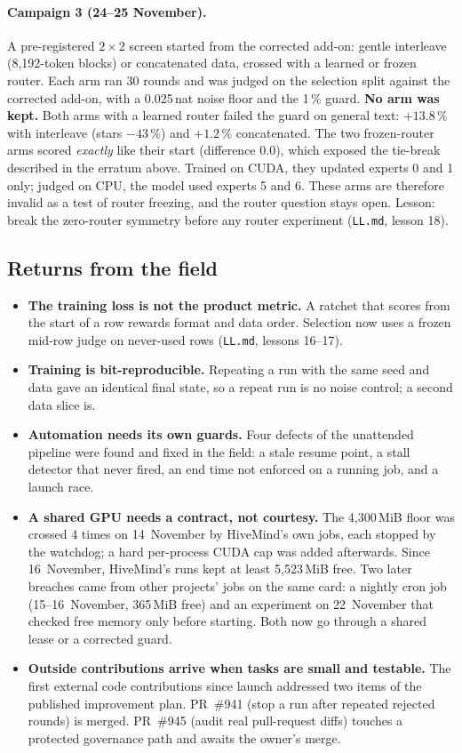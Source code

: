 \documentclass[11pt,a4paper]{article}
\begin{document}
\paragraph{Campaign 3 (24--25 November).} A pre-registered $2\times2$ screen started from the corrected add-on:
gentle interleave (8{,}192-token blocks) or concatenated data, crossed with a learned or frozen router. Each arm ran
30 rounds and was judged on the selection split against the corrected add-on, with a 0.025\,nat noise floor and the 1\,\%
guard. \textbf{No arm was kept.} Both arms with a learned router failed the guard on general text: $+13.8\,\%$ with
interleave (stars $-43\,\%$) and $+1.2\,\%$ concatenated. The two frozen-router arms scored \emph{exactly} like their start
(difference $0.0$), which exposed the tie-break described in the erratum above. Trained on CUDA, they updated experts 0
and 1 only; judged on CPU, the model used experts 5 and 6. These arms are therefore invalid as a test of router
freezing, and the router question stays open. Lesson: break the zero-router symmetry before any router experiment
(\texttt{LL.md}, lesson 18).

\subsection{Returns from the field}
\begin{itemize}[leftmargin=*,itemsep=2pt]
  \item \textbf{The training loss is not the product metric.} A ratchet that scores from the start of a row rewards
    format and data order. Selection now uses a frozen mid-row judge on never-used rows (\texttt{LL.md}, lessons 16--17).
  \item \textbf{Training is bit-reproducible.} Repeating a run with the same seed and data gave an identical final
    state, so a repeat run is no noise control; a second data slice is.
  \item \textbf{Automation needs its own guards.} Four defects of the unattended pipeline were found and fixed in the
    field: a stale resume point, a stall detector that never fired, an end time not enforced on a running job, and a
    launch race.
  \item \textbf{A shared GPU needs a contract, not courtesy.} The 4{,}300\,MiB floor was crossed 4 times on
    14~November by HiveMind's own jobs, each stopped by the watchdog; a hard per-process CUDA cap was added afterwards.
    Since 16~November, HiveMind's runs kept at least 5{,}523\,MiB free. Two later breaches came from other projects'
    jobs on the same card: a nightly cron job (15--16~November, 365\,MiB free) and an experiment on 22~November that
    checked free memory only before starting. Both now go through a shared lease or a corrected guard.
  \item \textbf{Outside contributions arrive when tasks are small and testable.} The first external code contributions
    since launch addressed two items of the published improvement plan. PR~\#941 (stop a run after repeated rejected
    rounds) is merged. PR~\#945 (audit real pull-request diffs) touches a protected governance path and awaits the
    owner's merge.
\end{itemize}
\end{document}
